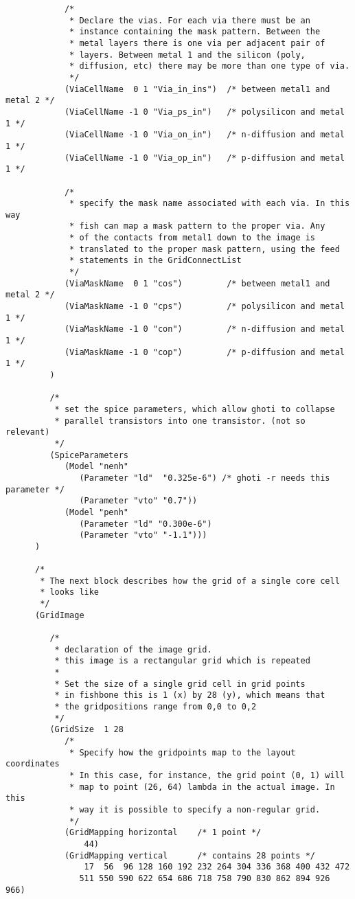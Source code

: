 {\begin{verbatim}
            /* 
             * Declare the vias. For each via there must be an
             * instance containing the mask pattern. Between the
             * metal layers there is one via per adjacent pair of
             * layers. Between metal 1 and the silicon (poly,
             * diffusion, etc) there may be more than one type of via.
             */
            (ViaCellName  0 1 "Via_in_ins")  /* between metal1 and metal 2 */
            (ViaCellName -1 0 "Via_ps_in")   /* polysilicon and metal 1 */
            (ViaCellName -1 0 "Via_on_in")   /* n-diffusion and metal 1 */
            (ViaCellName -1 0 "Via_op_in")   /* p-diffusion and metal 1 */

            /*
             * specify the mask name associated with each via. In this way
             * fish can map a mask pattern to the proper via. Any
             * of the contacts from metal1 down to the image is
             * translated to the proper mask pattern, using the feed
             * statements in the GridConnectList
             */
            (ViaMaskName  0 1 "cos")         /* between metal1 and metal 2 */
            (ViaMaskName -1 0 "cps")         /* polysilicon and metal 1 */
            (ViaMaskName -1 0 "con")         /* n-diffusion and metal 1 */
            (ViaMaskName -1 0 "cop")         /* p-diffusion and metal 1 */
         )

         /*
          * set the spice parameters, which allow ghoti to collapse
          * parallel transistors into one transistor. (not so relevant)
          */
         (SpiceParameters
            (Model "nenh"
               (Parameter "ld"  "0.325e-6") /* ghoti -r needs this parameter */
               (Parameter "vto" "0.7"))
            (Model "penh"
               (Parameter "ld" "0.300e-6")
               (Parameter "vto" "-1.1")))
      )

      /*
       * The next block describes how the grid of a single core cell
       * looks like
       */
      (GridImage

         /*
          * declaration of the image grid. 
          * this image is a rectangular grid which is repeated 
          *
          * Set the size of a single grid cell in grid points 
          * in fishbone this is 1 (x) by 28 (y), which means that
          * the gridpositions range from 0,0 to 0,2
          */
         (GridSize  1 28
            /*
             * Specify how the gridpoints map to the layout coordinates
             * In this case, for instance, the grid point (0, 1) will 
             * map to point (26, 64) lambda in the actual image. In this 
             * way it is possible to specify a non-regular grid.
             */ 
            (GridMapping horizontal    /* 1 point */
                44) 
            (GridMapping vertical      /* contains 28 points */
                17  56  96 128 160 192 232 264 304 336 368 400 432 472
               511 550 590 622 654 686 718 758 790 830 862 894 926 966)


\end{verbatim}}
